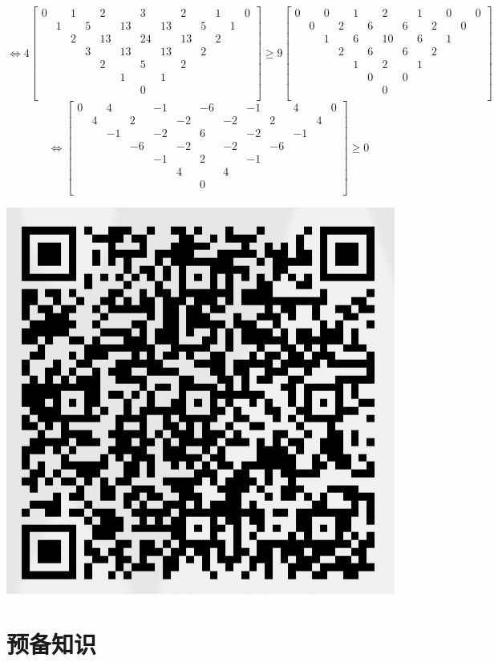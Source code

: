 \documentclass[UTF8]{ctexart}
\begin{document}
$$\Leftrightarrow 
4\left[
\begin{smallmatrix}
	0& &1& &2& &3& &2& &1& &0\\
	&1& &5& &13& &13& &5& &1&\\
	& &2& &13& &24& &13& &2& &\\
	& & &3& &13& &13& &2& & &\\
	& & & &2& &5& &2& & & &\\
	& & & & &1& &1& & & & &\\
	& & & & & &0& & & & & &\\
\end{smallmatrix}
\right]\geq 9
\left[
\begin{smallmatrix}
	0& &0& &1& &2& &1& &0& &0\\
	&0& &2& &6& &6& &2& &0&\\
	& &1& &6& &10& &6& &1& &\\
	& & &2& &6& &6& &2& & &\\
	& & & &1& &2& &1& & & &\\
	& & & & &0& &0& & & & &\\
	& & & & & &0& & & & & &\\
\end{smallmatrix}
\right]
$$
$$\Leftrightarrow 
\left[
\begin{smallmatrix}
	0& &4& &-1& &-6& &-1& &4& &0\\
	&4& &2& &-2& &-2& &2& &4&\\
	& &-1& &-2& &6& &-2& &-1& &\\
	& & &-6& &-2& &-2& &-6& & &\\
	& & & &-1& &2& &-1& & & &\\
	& & & & &4& &4& & & & &\\
	& & & & & &0& & & & & &\\
\end{smallmatrix}
\right]\geq 0
$$
\begin{center}
	\includegraphics[width=0.25\linewidth]{z}
\end{center}

\newpage
\tableofcontents

\newpage

\section{预备知识} 
\end{document}
